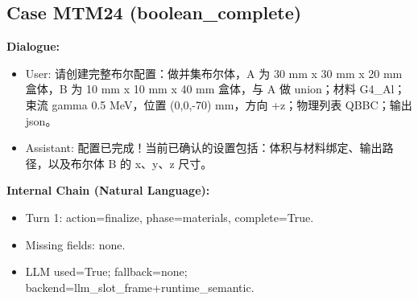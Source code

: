 \documentclass[11pt]{ctexart}
\begin{document}
\subsection{Case MTM24 (boolean\_complete)}
\textbf{Dialogue:}
\begin{itemize}
\item User: 请创建完整布尔配置：做并集布尔体，A 为 30 mm x 30 mm x 20 mm 盒体，B 为 10 mm x 10 mm x 40 mm 盒体，与 A 做 union；材料 G4\_Al；束流 gamma 0.5 MeV，位置 (0,0,-70) mm，方向 +z；物理列表 QBBC；输出 json。
\item Assistant: 配置已完成！当前已确认的设置包括：体积与材料绑定、输出路径，以及布尔体 B 的 x、y、z 尺寸。
\end{itemize}
\textbf{Internal Chain (Natural Language):}
\begin{itemize}
\item Turn 1: action=finalize, phase=materials, complete=True.
\item Missing fields: none.
\item LLM used=True; fallback=none; backend=llm\_slot\_frame+runtime\_semantic.
\end{itemize}
\end{document}
